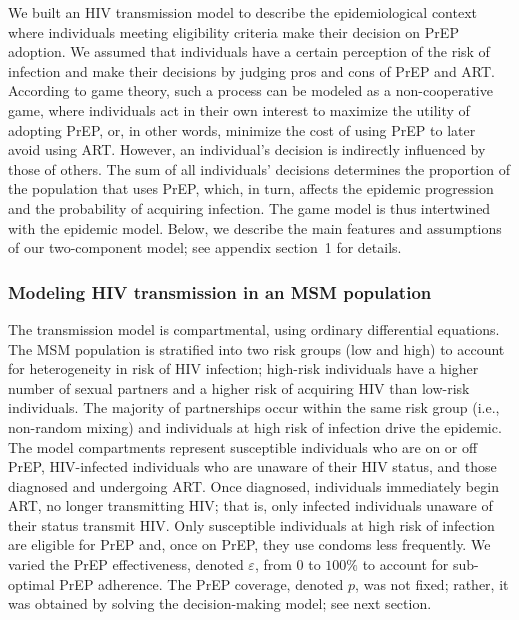 \documentclass[preprint,review,12pt]{article}			%
\begin{document}
We built an HIV transmission model to describe the epidemiological context where individuals meeting eligibility criteria make their decision on PrEP adoption. We assumed that individuals have a certain perception of the risk of infection and make their decisions by judging pros and cons of PrEP and ART. According to game theory, such a process can be modeled as a non-cooperative game, where individuals act in their own interest to maximize the utility of adopting PrEP, or, in other words, minimize the cost of using PrEP to later avoid using ART. However, an individual's decision is indirectly influenced by those of others. The sum of all individuals' decisions determines the proportion of the population that uses PrEP, which, in turn, affects the epidemic progression and the probability of acquiring infection. The game model is thus intertwined with the epidemic model. Below, we describe the main features and assumptions of our two-component model; see appendix section~1 for details. 

\subsubsection{Modeling HIV transmission in an MSM population} \label{subsec:TransmissionModel}

The transmission model is compartmental, using ordinary differential equations. The MSM population is stratified into two risk groups (low and high) to account for heterogeneity in risk of HIV infection;\cite{Jacquez1989} high-risk individuals have a higher number of sexual partners and a higher risk of acquiring HIV than low-risk individuals. The majority of partnerships occur within the same risk group (i.e., non-random mixing)\cite{Jacquez1988} and individuals at high risk of infection drive the epidemic.\cite{Lions2019} The model compartments represent susceptible individuals who are on or off PrEP, HIV-infected individuals who are unaware of their HIV status, and those diagnosed and undergoing ART. Once diagnosed, individuals immediately begin ART, no longer transmitting HIV; that is, only infected individuals unaware of their status transmit HIV. Only susceptible individuals at high risk of infection are eligible for PrEP and, once on PrEP, they use condoms less frequently.\cite{Molina2018} We varied the PrEP effectiveness, denoted $\varepsilon$, from $0$ to $100\%$ to account for sub-optimal PrEP adherence. The PrEP coverage, denoted $p$, was not fixed; rather, it was obtained by solving the decision-making model; see next section.
\end{document}
